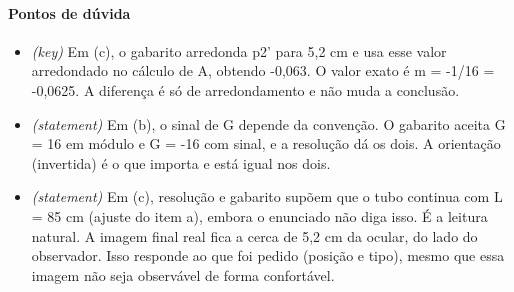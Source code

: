 \documentclass{article}%
\begin{document}
\paragraph{Pontos de dúvida}%
\begin{itemize}%
\item%
\textit{(key)} Em (c), o gabarito arredonda p2' para 5,2 cm e usa esse valor arredondado no cálculo de A, obtendo -0,063. O valor exato é m = -1/16 = -0,0625. A diferença é só de arredondamento e não muda a conclusão.%
\item%
\textit{(statement)} Em (b), o sinal de G depende da convenção. O gabarito aceita G = 16 em módulo e G = -16 com sinal, e a resolução dá os dois. A orientação (invertida) é o que importa e está igual nos dois.%
\item%
\textit{(statement)} Em (c), resolução e gabarito supõem que o tubo continua com L = 85 cm (ajuste do item a), embora o enunciado não diga isso. É a leitura natural. A imagem final real fica a cerca de 5,2 cm da ocular, do lado do observador. Isso responde ao que foi pedido (posição e tipo), mesmo que essa imagem não seja observável de forma confortável.%
\end{itemize}%
\end{document}
